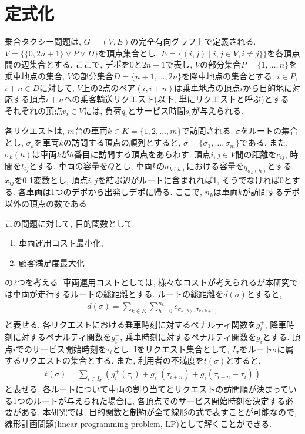 \chapter{定式化}\label{formulation}
乗合タクシー問題は, $G = (V, E)$の完全有向グラフ上で定義される. $V =\{\{0,2n+1\} \lor P \lor D\}$を頂点集合とし, $E = \{(i,j) \mid i,j\in V ,i \neq j\}\}$を各頂点間の辺集合とする. 
ここで, デポを$0$と$2n+1$で表し, $V$の部分集合$P =\{1,\ldots,n \}$を乗車地点の集合, $V$の部分集合$D =\{n+1,\ldots,2n \}$を降車地点の集合とする. 
$i \in P$, $i+n \in D$に対して, $V$上の2点のペア$(i,i+n)$は乗車地点の頂点$i$から目的地に対応する頂点$i+n$への乗客輸送リクエスト(以下, 単にリクエストと呼ぶ)とする. 
それぞれの頂点$v_i \in V$には, 負荷$q_i$とサービス時間$s_i$が与えられる.

各リクエストは, $m$台の車両$k \in K = \{1,2,\ldots,m\}$で訪問される. 
$\sigma$をルートの集合とし, $\sigma_k$を車両$k$の訪問する頂点の順列とすると, $\sigma = \{\sigma_1,\ldots,\sigma_m\}$である. また, $\sigma_k(h)$は車両$k$が$h$番目に訪問する頂点をあらわす.
頂点$i,j \in V$間の距離を$c_{ij}$, 時間を$t_{ij}$とする.
車両の容量を$Q$とし, 車両$k$の$\sigma _{k(h)}$における容量を$q_{\sigma_k(h)}$とする.
$x_{ij}$を0-1変数とし, 頂点$i,j$を結ぶ辺がルートに含まれれば1, そうでなければ0とする.
各車両は1つのデポから出発しデポに帰る. ここで, $n_k$は車両$k$が訪問するデポ以外の頂点の数である

この問題に対して, 目的関数として
\begin{enumerate}
 \item 車両運用コスト最小化,
 \item 顧客満足度最大化
\end{enumerate}
の2つを考える. 車両運用コストとしては, 様々なコストが考えられるが本研究では車両が走行するルートの総距離とする. ルートの総距離を$d(\sigma)$とすると,
\begin{align*}
d(\sigma) = \sum_ {k\in K} \sum_{h=0}^{n_k} c_ {\sigma_{k(h)},\sigma_ {k(h+1)} }\\
\end{align*}
と表せる.
各リクエストにおける乗車時刻に対するペナルティ関数を$g^+_i$, 降車時刻に対するペナルティ関数を$g^-_i$, 乗車時刻に対するペナルティ関数を$g_i$とする.
頂点$i$でのサービス開始時刻を$\tau_i$とし, Iをリクエスト集合として, $I_\sigma$をルート$\sigma$に属するリクエストの集合とする.
また, 利用者の不満度を$t(\sigma)$とすると,
\begin{align*}
t(\sigma) = \sum_ {i \in I_\sigma} (g^+_i(\tau_i)+g^-_i(\tau_{i+n})+g_i(\tau_{i+n}-\tau_i))
\end{align*}
と表せる. 各ルートについて車両の割り当てとリクエストの訪問順が決まっている1つのルートが与えられた場合に, 各頂点でのサービス開始時刻を決定する必要がある. 本研究では, 目的関数と制約が全て線形の式で表すことが可能なので, 線形計画問題(linear programming problem, LP)として解くことができる.

